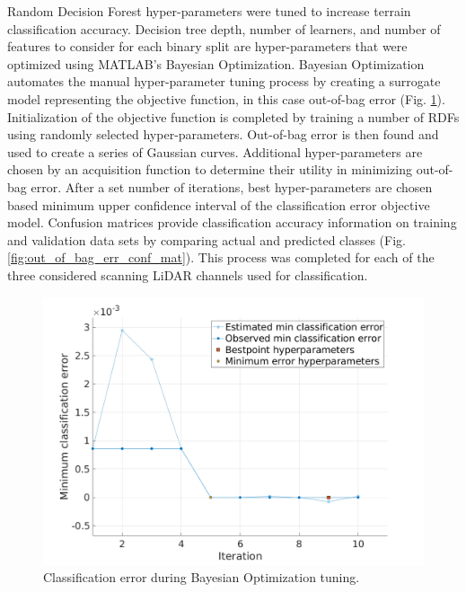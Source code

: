 \documentclass[numbered,pdftex]{ohio-etd}
\begin{document}
{{{{				{Random Decision Forest hyper-parameters were tuned to increase terrain classification accuracy. Decision tree depth, number of learners, and number of features to consider for each binary split are hyper-parameters that were optimized using MATLAB's Bayesian Optimization. Bayesian Optimization automates the manual hyper-parameter tuning process by creating a surrogate model representing the objective function, in this case out-of-bag error (Fig. \ref{fig:c2_min_class_error}). Initialization of the objective function is completed by training a number of RDFs using randomly selected hyper-parameters. Out-of-bag error is then found and used to create a series of Gaussian curves. Additional hyper-parameters are chosen by an acquisition function to determine their utility in minimizing out-of-bag error. After a set number of iterations, best hyper-parameters are chosen based minimum upper confidence interval of the classification error objective model. Confusion matrices provide classification accuracy information on training and validation data sets by comparing actual and predicted classes (Fig. \ref{fig:out_of_bag_err_conf_mat}). This process was completed for each of the three considered scanning LiDAR channels used for classification.}
					
				\begin{figure}[H]
					\centering
					\includegraphics[width=0.5\linewidth]{Defense_Images/c2_bayesian_range}
					\caption[Bayesian Optimization - RANGE]{Classification error during Bayesian Optimization tuning.}
					\label{fig:c2_min_class_error}
				\end{figure}				
				
}}}}
\end{document}
